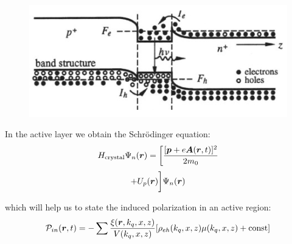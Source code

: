 \begin{minipage}{0.45\textwidth}
    \begin{figure}[h]
    \centering
    \includegraphics[width=1.1\textwidth]{images/hh-ee.png}
\end{figure}
\end{minipage}
\hfill
\begin{minipage}{0.49\textwidth}
    In the active layer we obtain the Schr\"odinger equation:
    \begin{equation*}
	H_{\text{crystal}} \Psi_n(\mbox{\boldmath $r$}) = \bigg[\frac{[\mbox{\boldmath $p$} + e \mbox{\boldmath $A$}(\mbox{\boldmath $r$}, t)]^2}{2 m_0}
\end{equation*}
\begin{equation}
	 + U_p(\mbox{\boldmath $r$})\bigg] \Psi_n(\mbox{\boldmath $r$})
\end{equation}
\end{minipage}

which will help us to state the induced polarization in an active region:
\begin{equation}
	\mathcal{P}_{in}(\mbox{\boldmath $r$}, t) = - \sum \frac{\xi(\mbox{\boldmath $r$},k_q, x, z)}{V(k_q, x, z)}[\rho_{eh}(k_q, x, z)\mu(k_q, x, z) + \text{const}]	
\end{equation}
